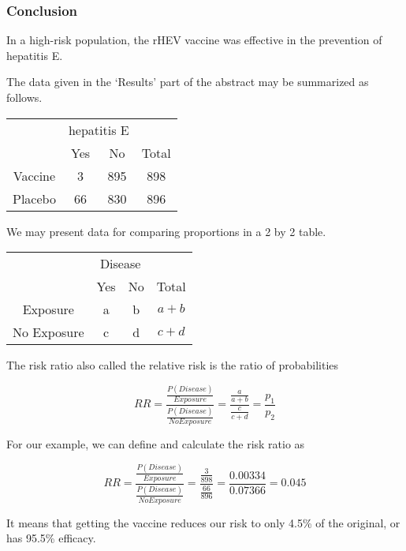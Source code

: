 \documentclass[11pt]{book}\usepackage[]{graphicx}\usepackage[]{color}
\begin{document}
\subsubsection{Conclusion}

In a high-risk population, the rHEV vaccine was effective in the prevention of
hepatitis E.

The data given in the `Results' part of the abstract may be summarized as follows.

\begin{table}[ht]
\centering
\begin{tabular}{@{} cccc @{}} \hline
 & \multicolumn{2}{c}{hepatitis E} \\
 & Yes & No & Total \\ \hline
 Vaccine & 3 & 895 & 898 \\
 Placebo  & 66 & 830 & 896 \\ \hline
 \end{tabular}
 \end{table}

We may present data for comparing proportions in a 2 by 2 table.

\begin{table}[ht]
\centering
\begin{tabular}{@{} cccc @{}} \hline
 & \multicolumn{2}{c}{Disease} \\
 & Yes & No & Total \\ \hline
 Exposure & a & b & $a + b$ \\
 No Exposure  & c & d & $c + d$ \\ \hline
 \end{tabular}
 \end{table}

The risk ratio also called the relative risk is the ratio of probabilities

\begin{equation*}
  RR = \frac{ \frac{P(Disease)}{Exposure}}{ \frac{P(Disease)}{No Exposure} } = \frac{ \frac{a}{a + b}}{ \frac{c}{c + d} } = \frac{p_1}{p_2}
\end{equation*}

For our example, we can define and calculate the risk ratio as

\begin{equation*}
  RR = \frac{ \frac{P(Disease)}{Exposure}}{ \frac{P(Disease)}{No Exposure} } = \frac{ \frac{3}{898}}{ \frac{66}{896} } = \frac{0.00334}{0.07366} = 0.045
\end{equation*}

It means that getting the vaccine reduces our risk to only 4.5\% of the original, or has 95.5\% efficacy.
\end{document}
